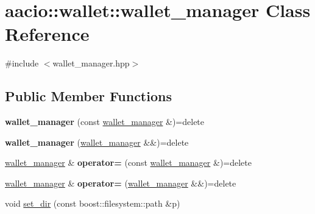 \hypertarget{classaacio_1_1wallet_1_1wallet__manager}{}\section{aacio\+:\+:wallet\+:\+:wallet\+\_\+manager Class Reference}
\label{classaacio_1_1wallet_1_1wallet__manager}


{\ttfamily \#include $<$wallet\+\_\+manager.\+hpp$>$}

\subsection*{Public Member Functions}
\begin{DoxyCompactItemize}
\item 
\mbox{\label{classaacio_1_1wallet_1_1wallet__manager_a0547be5d34ce11dd4ccf8cfc7b198bb8}} 
{\bfseries wallet\+\_\+manager} (const \mbox{\hyperlink{classaacio_1_1wallet_1_1wallet__manager}{wallet\+\_\+manager}} \&)=delete
\item 
\mbox{\label{classaacio_1_1wallet_1_1wallet__manager_a928cfb7c90206f8d14c890be4d839647}} 
{\bfseries wallet\+\_\+manager} (\mbox{\hyperlink{classaacio_1_1wallet_1_1wallet__manager}{wallet\+\_\+manager}} \&\&)=delete
\item 
\mbox{\label{classaacio_1_1wallet_1_1wallet__manager_a4e37ec3e71d3ca2bfeca314a7e5ad832}} 
\mbox{\hyperlink{classaacio_1_1wallet_1_1wallet__manager}{wallet\+\_\+manager}} \& {\bfseries operator=} (const \mbox{\hyperlink{classaacio_1_1wallet_1_1wallet__manager}{wallet\+\_\+manager}} \&)=delete
\item 
\mbox{\label{classaacio_1_1wallet_1_1wallet__manager_a39adda4cd1923c3f423e1b701d128370}} 
\mbox{\hyperlink{classaacio_1_1wallet_1_1wallet__manager}{wallet\+\_\+manager}} \& {\bfseries operator=} (\mbox{\hyperlink{classaacio_1_1wallet_1_1wallet__manager}{wallet\+\_\+manager}} \&\&)=delete
\item 
void \mbox{\hyperlink{classaacio_1_1wallet_1_1wallet__manager_a06718c234c36be68c39f63d343eb5289}{set\+\_\+dir}} (const boost\+::filesystem\+::path \&p)
\item 

\end{DoxyCompactItemize}
